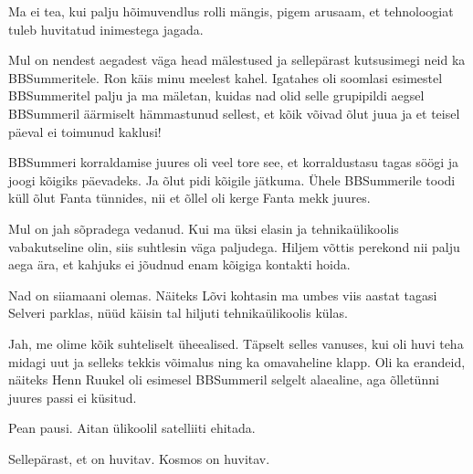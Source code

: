 
Ma ei tea, kui palju hõimuvendlus rolli mängis, pigem arusaam, et tehnoloogiat tuleb huvitatud inimestega jagada. 

Mul on nendest aegadest väga head mälestused ja sellepärast kutsusimegi neid ka BBSummeritele. Ron käis minu meelest kahel. Igatahes oli
soomlasi esimestel BBSummeritel palju ja ma mäletan, kuidas nad olid selle grupipildi aegsel BBSummeril äärmiselt
hämmastunud sellest, et kõik võivad õlut juua ja et teisel päeval ei toimunud 
kaklusi!

BBSummeri korraldamise juures oli veel tore see, et korraldustasu
tagas söögi ja joogi kõigiks päevadeks. Ja õlut pidi kõigile jätkuma. Ühele BBSummerile toodi küll õlut Fanta tünnides, nii et 
õllel oli kerge Fanta mekk juures.


Mul on jah sõpradega vedanud. Kui ma üksi elasin ja 
tehnikaülikoolis 
vabakutseline olin, siis suhtlesin väga paljudega. 
Hiljem võttis perekond nii palju aega ära, et kahjuks ei jõudnud enam kõigiga 
kontakti hoida.


Nad on siiamaani olemas. Näiteks 
Lõvi kohtasin ma umbes viis aastat tagasi Selveri 
parklas, nüüd käisin tal hiljuti tehnikaülikoolis külas.


Jah, me olime kõik suhteliselt üheealised. Täpselt selles 
vanuses, kui oli huvi teha midagi uut ja selleks tekkis võimalus ning ka omavaheline klapp. Oli ka erandeid, näiteks Henn Ruukel 
oli esimesel BBSummeril selgelt alaealine, aga õlletünni juures passi ei 
küsitud.


Pean pausi. Aitan ülikoolil satelliiti ehitada. 


Sellepärast, et on huvitav. Kosmos on huvitav.


